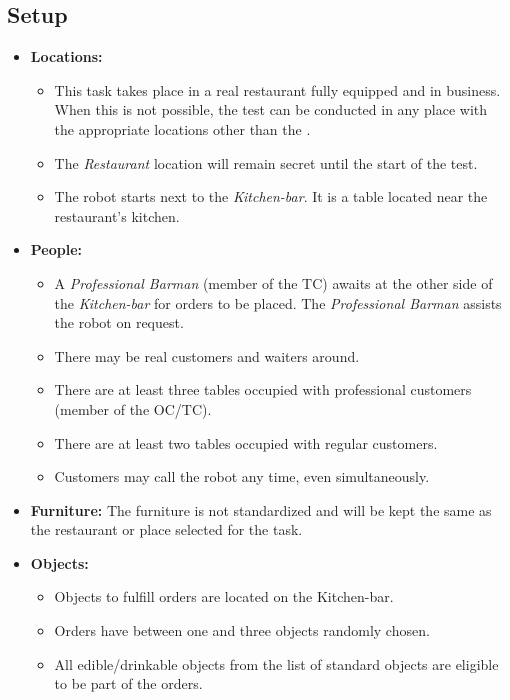 \subsection*{Setup}
\begin{itemize}[nosep]	
	\item \textbf{Locations:} 
	\begin{itemize}
		\item This task takes place in a real restaurant fully equipped and in business. When this is not possible, the test can be conducted in any place with the appropriate locations other than the \Arena{}.
		\item The \emph{Restaurant} location will remain secret until the start of the test.
		\item The robot starts next to the \emph{Kitchen-bar}. It is a table located near the restaurant's kitchen.
	\end{itemize}	 
	\item \textbf{People:} 
	\begin{itemize}
		\item  A \emph{Professional Barman} (member of the TC) awaits at the other side of the \emph{Kitchen-bar} for orders to be placed. The \emph{Professional Barman} assists the robot on request.
		\item There may be real customers and waiters around.
		\item There are at least three tables occupied with professional customers (member of the OC/TC). 
		\item There are at least two tables occupied with regular customers.
		\item Customers may call the robot any time, even simultaneously.
	\end{itemize}
	\item \textbf{Furniture:} The furniture is not standardized and will be kept the same as the restaurant or place selected for the task.
	\item \textbf{Objects:} 
	\begin{itemize}
	\item Objects to fulfill orders are located on the Kitchen-bar.
	\item Orders have between one and three objects randomly chosen.
	\item All edible/drinkable objects from the list of standard objects are eligible to be part of the orders.
	\end{itemize}
\end{itemize}

